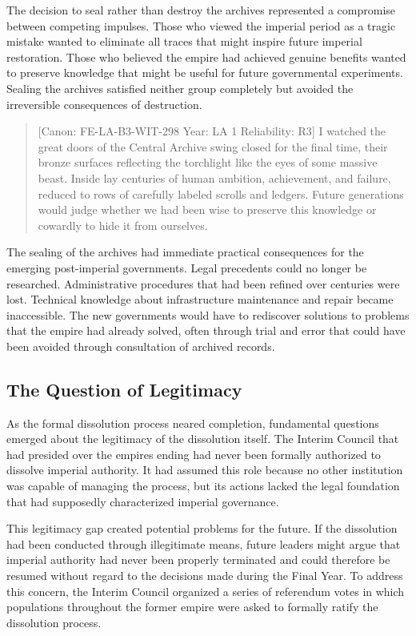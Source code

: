 The decision to seal rather than destroy the archives represented a
compromise between competing impulses. Those who viewed the imperial
period as a tragic mistake wanted to eliminate all traces that might
inspire future imperial restoration. Those who believed the empire had
achieved genuine benefits wanted to preserve knowledge that might be
useful for future governmental experiments. Sealing the archives
satisfied neither group completely but avoided the irreversible
consequences of destruction.

\begin{quote}
{[}Canon: FE-LA-B3-WIT-298 \textbar{} Year: LA 1 \textbar{} Reliability:
R3{]} I watched the great doors of the Central Archive swing closed for
the final time, their bronze surfaces reflecting the torchlight like the
eyes of some massive beast. Inside lay centuries of human ambition,
achievement, and failure, reduced to rows of carefully labeled scrolls
and ledgers. Future generations would judge whether we had been wise to
preserve this knowledge or cowardly to hide it from ourselves.
\end{quote}

The sealing of the archives had immediate practical consequences for the
emerging post-imperial governments. Legal precedents could no longer be
researched. Administrative procedures that had been refined over
centuries were lost. Technical knowledge about infrastructure
maintenance and repair became inaccessible. The new governments would
have to rediscover solutions to problems that the empire had already
solved, often through trial and error that could have been avoided
through consultation of archived records.

\subsection{The Question of
Legitimacy}\label{the-question-of-legitimacy}

As the formal dissolution process neared completion, fundamental
questions emerged about the legitimacy of the dissolution itself. The
Interim Council that had presided over the empire\textquotesingle s
ending had never been formally authorized to dissolve imperial
authority. It had assumed this role because no other institution was
capable of managing the process, but its actions lacked the legal
foundation that had supposedly characterized imperial governance.

This legitimacy gap created potential problems for the future. If the
dissolution had been conducted through illegitimate means, future
leaders might argue that imperial authority had never been properly
terminated and could therefore be resumed without regard to the
decisions made during the Final Year. To address this concern, the
Interim Council organized a series of referendum votes in which
populations throughout the former empire were asked to formally ratify
the dissolution process.


